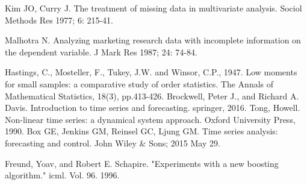 \documentclass[11pt]{report}           %
\begin{document}
\begin{thebibliography}{80}
Kim JO, Curry J. The treatment of missing data in multivariate
analysis. Sociol Methods Res 1977; 6: 215-41.

 Malhotra N. Analyzing marketing research data with incomplete information on the dependent variable. J Mark Res 1987; 24: 74-84.
 
 Hastings, C., Mosteller, F., Tukey, J.W. and Winsor, C.P., 1947. Low moments for small samples: a comparative study of order statistics. The Annals of Mathematical Statistics, 18(3), pp.413-426.
 Brockwell, Peter J., and Richard A. Davis. Introduction to time series and forecasting. springer, 2016.
 Tong, Howell. Non-linear time series: a dynamical system approach. Oxford University Press, 1990.
 Box GE, Jenkins GM, Reinsel GC, Ljung GM. Time series analysis: forecasting and control. John Wiley & Sons; 2015 May 29.
 
 Freund, Yoav, and Robert E. Schapire. "Experiments with a new boosting algorithm." icml. Vol. 96. 1996.
 
 
 
 
\end{thebibliography}
\end{document}
